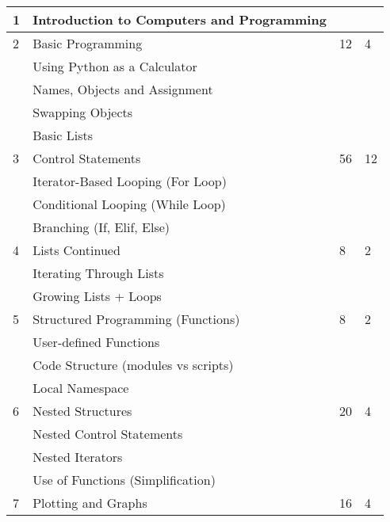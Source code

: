\begin{longtable}{|p{1.4cm}|p{8.4cm}|p{2.2cm}|p{1.8cm}|}
             1  & Introduction to Computers and Programming  &    &    \\
             \hline
             2  & Basic Programming                          & 12 & 4  \\
                & \qquad Using Python as a Calculator        &    &    \\
                & \qquad Names, Objects and Assignment       &    &    \\
                & \qquad Swapping Objects                    &    &    \\
                & \qquad Basic Lists                         &    &    \\
             \hline
             3  & Control Statements                         & 56 & 12 \\
                & \qquad Iterator-Based Looping (For Loop)   &    &    \\
                & \qquad Conditional Looping (While Loop)    &    &    \\
                & \qquad Branching (If, Elif, Else)          &    &    \\
             \hline
             4  & Lists Continued                            &  8 & 2  \\
                & \qquad Iterating Through Lists             &    &    \\
                & \qquad Growing Lists + Loops               &    &    \\
             \hline
             5  & Structured Programming (Functions)         &  8 & 2  \\
                & \qquad User-defined Functions              &    &    \\
                & \qquad Code Structure (modules vs scripts) &    &    \\
                & \qquad Local Namespace                     &    &    \\
             \hline
             6  & Nested Structures                          & 20 & 4  \\
                & \qquad Nested Control Statements           &    &    \\
                & \qquad Nested Iterators                    &    &    \\
                & \qquad Use of Functions (Simplification)   &    &    \\
             \hline
             7  & Plotting and Graphs                        & 16 & 4  \\

\end{longtable}
